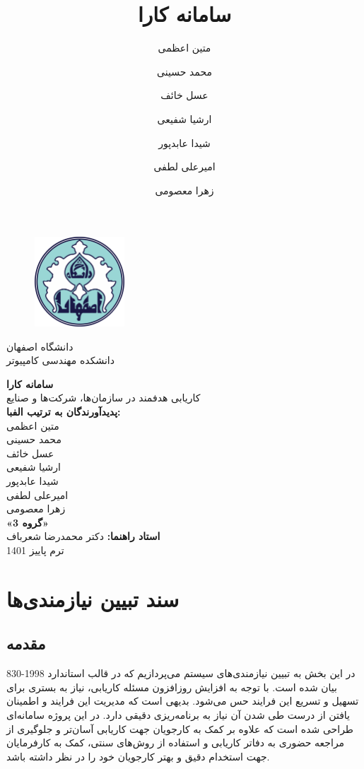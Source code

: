 \documentclass[12pt]{article}
\author{متین اعظمی}
\author{محمد حسینی}
\author{عسل خائف}
\author{ارشیا شفیعی}
\author{شیدا عابدپور}
\author{امیرعلی لطفی}
\author{زهرا معصومی}
\title{سامانه کارا}
\begin{document}
	\begin{figure}
		\centering
		\includegraphics[width=0.3\textwidth]{files/logo}
	\end{figure}
	\begin{center}
		دانشگاه اصفهان\\
		دانشکده مهندسی کامپیوتر
		\vspace{2\baselineskip}

		{\Huge \textbf{سامانه کارا}}\\

		\vspace{1\baselineskip}
		کاریابی هدفمند در سازمان‌ها، شرکت‌ها و صنایع\\

		\vspace{2\baselineskip}
		\textbf{پدیدآورندگان به ترتیب الفبا:}\\
		متین اعظمی\\
		محمد حسینی\\
		عسل خائف\\
		ارشیا شفیعی\\
		شیدا عابدپور\\
		امیرعلی لطفی\\
		زهرا معصومی\\
		\vspace{2\baselineskip}
		\textbf{«گروه 3»}\\
		\vspace{3\baselineskip}
		{\textbf{استاد راهنما:}}
		دکتر محمدرضا شعرباف\\
		\vspace{3\baselineskip}
		ترم پاییز 1401

	\end{center}

	\newpage
	\tableofcontents
	\newpage
	\listoftables
	\newpage
	\listoffigures
	\newpage

	\section{سند تبیین نیازمندی‌ها}

	\subsection{مقدمه}
	در این بخش به تبیین نیازمندی‌های سیستم می‌پردازیم که در قالب استاندارد 1998-830
	\textbf{}
	بیان شده است.
	با توجه به افزایش روزافزون مسئله کاریابی، نیاز به بستری برای تسهیل و تسریع این فرایند حس می‌شود. بدیهی است که مدیریت این فرایند و اطمینان یافتن از درست طی شدن آن نیاز به برنامه‌ریزی دقیقی دارد.
	در این پروژه سامانه‌ای طراحی شده است که علاوه بر کمک به کارجویان جهت کاریابی آسان‌تر و جلوگیری از مراجعه حضوری به دفاتر کاریابی و استفاده از روش‌های سنتی، کمک به کارفرمایان جهت استخدام دقیق و بهتر کارجویان خود را در نظر داشته باشد.
\end{document}
